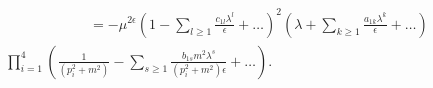 \begin{equation}
\begin{split}
\hspace{1in}=-\mu^{2\epsilon} (1-\sum_{l\geq 1} \frac{c_{1l}\lambda^{l}}{\epsilon} +\dots)^{2}(\lambda +\sum_{k\geq 1} \frac{a_{1k}\lambda^{k}}{\epsilon}+\dots)\\
\prod_{i=1}^{4}(\frac{1}{(p_{i}^{2}+m^{2})}
-\sum_{s\geq 1}\frac{b_{1s}m^{2}\lambda^{s}}{(p_{i}^{2}+m^{2})\epsilon}+\dots).\label{z.1}
\end{split}
\end{equation}

